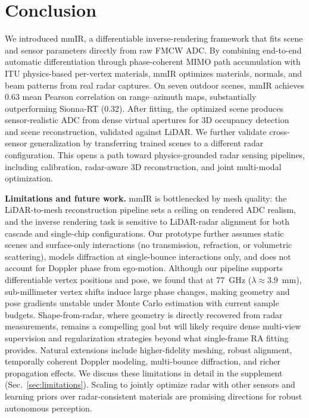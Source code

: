 \section{Conclusion}

We introduced mmIR, a differentiable inverse-rendering framework that fits scene and sensor parameters directly from raw FMCW ADC. By combining end-to-end automatic differentiation through phase-coherent MIMO path accumulation with ITU physics-based per-vertex materials, mmIR optimizes materials, normals, and beam patterns from real radar captures. On seven outdoor scenes, mmIR achieves 0.63 mean Pearson correlation on range--azimuth maps, substantially outperforming Sionna-RT (0.32). After fitting, the optimized scene produces sensor-realistic ADC from dense virtual apertures for 3D occupancy detection and scene reconstruction, validated against LiDAR. We further validate cross-sensor generalization by transferring trained scenes to a different radar configuration. This opens a path toward physics-grounded radar sensing pipelines, including calibration, radar-aware 3D reconstruction, and joint multi-modal optimization.

\textbf{Limitations and future work.} mmIR is bottlenecked by mesh quality: the LiDAR-to-mesh reconstruction pipeline sets a ceiling on rendered ADC realism, and the inverse rendering task is sensitive to LiDAR-radar alignment for both cascade and single-chip configurations. Our prototype further assumes static scenes and surface-only interactions (no transmission, refraction, or volumetric scattering), models diffraction at single-bounce interactions only, and does not account for Doppler phase from ego-motion. Although our pipeline supports differentiable vertex positions and pose, we found that at 77~GHz ($\lambda \approx 3.9$~mm), sub-millimeter vertex shifts induce large phase changes, making geometry and pose gradients unstable under Monte Carlo estimation with current sample budgets. Shape-from-radar, where geometry is directly recovered from radar measurements, remains a compelling goal but will likely require dense multi-view supervision and regularization strategies beyond what single-frame RA fitting provides. Natural extensions include higher-fidelity meshing, robust alignment, temporally coherent Doppler modeling, multi-bounce diffraction, and richer propagation effects. We discuss these limitations in detail in the supplement (Sec.~\ref{sec:limitations}). Scaling to jointly optimize radar with other sensors and learning priors over radar-consistent materials are promising directions for robust autonomous perception.
